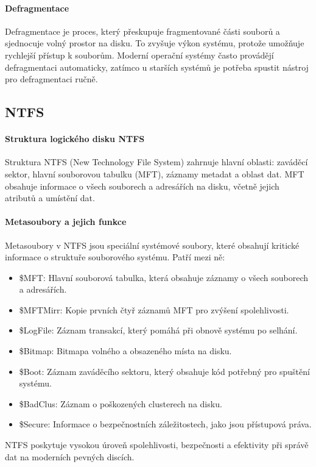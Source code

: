 \paragraph{Defragmentace}
Defragmentace je proces, který přeskupuje fragmentované části souborů a sjednocuje volný prostor na disku. To zvyšuje výkon systému, protože umožňuje rychlejší přístup k souborům. Moderní operační systémy často provádějí defragmentaci automaticky, zatímco u starších systémů je potřeba spustit nástroj pro defragmentaci ručně.

\subsection{NTFS}
\paragraph{Struktura logického disku NTFS}
Struktura NTFS (New Technology File System) zahrnuje hlavní oblasti: zaváděcí sektor, hlavní souborovou tabulku (MFT), záznamy metadat a oblast dat. MFT obsahuje informace o všech souborech a adresářích na disku, včetně jejich atributů a umístění dat.

\paragraph{Metasoubory a jejich funkce}
Metasoubory v NTFS jsou speciální systémové soubory, které obsahují kritické informace o struktuře souborového systému. Patří mezi ně:
\begin{itemize}
    \item \$MFT: Hlavní souborová tabulka, která obsahuje záznamy o všech souborech a adresářích.
    \item \$MFTMirr: Kopie prvních čtyř záznamů MFT pro zvýšení spolehlivosti.
    \item \$LogFile: Záznam transakcí, který pomáhá při obnově systému po selhání.
    \item \$Bitmap: Bitmapa volného a obsazeného místa na disku.
    \item \$Boot: Záznam zaváděcího sektoru, který obsahuje kód potřebný pro spuštění systému.
    \item \$BadClus: Záznam o poškozených clusterech na disku.
    \item \$Secure: Informace o bezpečnostních záležitostech, jako jsou přístupová práva.
\end{itemize}
NTFS poskytuje vysokou úroveň spolehlivosti, bezpečnosti a efektivity při správě dat na moderních pevných discích.
